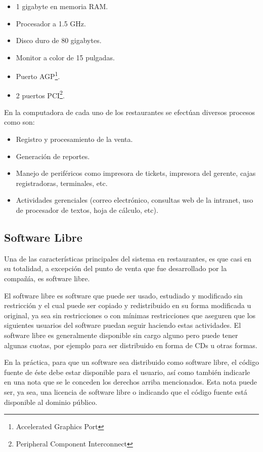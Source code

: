 \begin{itemize}
 \item 1 gigabyte en memoria RAM.
 \item Procesador a 1.5 GHz.
 \item Disco duro de 80 gigabytes.
 \item Monitor a color de 15 pulgadas.
 \item Puerto AGP\footnote{Accelerated Graphics Port}.
 \item 2 puertos PCI\footnote{Peripheral Component Interconnect}.
\end{itemize}


En la computadora de cada uno de los restaurantes se efectúan diversos procesos como son:

\begin{itemize}
 \item Registro y procesamiento de la venta.
 \item Generación de reportes.
 \item Manejo de periféricos como impresora de tickets, impresora del gerente, cajas registradoras, terminales, etc.
 \item Actividades gerenciales (correo electrónico, consultas web de la intranet, uso de procesador de textos, hoja de cálculo, etc).
\end{itemize}

\subsection{Software Libre}
\label{subsec:software_libre}

Una de las características principales del sistema en restaurantes, es que casi en su totalidad, a excepción del punto de venta que fue desarrollado por la compañía, es software libre.

El software libre es software que puede ser usado, estudiado y modificado sin restricción y el cual puede ser copiado y redistribuido en su forma modificada u original, ya sea sin restricciones o con mínimas restricciones que aseguren que los siguientes usuarios del software puedan seguir haciendo estas actividades. El software libre es generalmente disponible sin cargo alguno pero puede tener algunas cuotas, por ejemplo para ser distribuido en forma de CDs u otras formas.

En la práctica, para que un software sea distribuido como software libre, el código fuente de éste debe estar disponible para el usuario, así como también indicarle en una nota que se le conceden los derechos arriba mencionados. Esta nota puede ser, ya sea, una licencia de software libre o indicando que el código fuente está disponible al dominio público.

